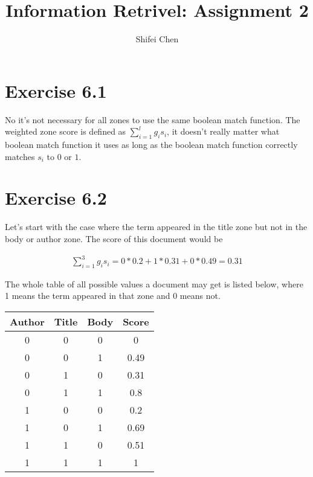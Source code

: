 \documentclass[11pt]{article} %
\title{{\LARGE Information Retrivel: Assignment 2}\\[1.5mm]} %
\author{Shifei Chen} %
\begin{document}
\maketitle

\section*{Exercise 6.1}

No it's not necessary for all zones to use the same boolean match function. The weighted zone score is defined as $\sum_{i=1}^{l}g_is_i$, it doesn't really matter what boolean match function it uses as long as the boolean match function correctly matches $s_i$ to $0$ or $1$.

\section*{Exercise 6.2}

Let's start with the case where the term appeared in the title zone but not in the body or author zone. The score of this document would be

\begin{align*}
    \sum_{i=1}^{3}g_is_i = 0 * 0.2 + 1 * 0.31 + 0 * 0.49 = 0.31
\end{align*}

The whole table of all possible values a document may get is listed below, where 1 means the term appeared in that zone and 0 means not.

\begin{table}[h]
    \begin{center}
        \begin{tabular}{c|c|c|c}
            \textbf{Author} & \textbf{Title} & \textbf{Body} & \textbf{Score}\\
            \hline
            0 & 0 & 0 & 0\\
            0 & 0 & 1 & 0.49\\
            0 & 1 & 0 & 0.31\\
            0 & 1 & 1 & 0.8\\
            1 & 0 & 0 & 0.2\\
            1 & 0 & 1 & 0.69\\
            1 & 1 & 0 & 0.51\\
            1 & 1 & 1 & 1\\
        \end{tabular}
    \end{center}
\end{table}
\end{document}
